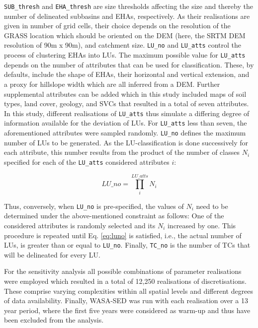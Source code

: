 \verb!SUB_thresh! and \verb!EHA_thresh! are size thresholds affecting the size and thereby the number of delineated subbasins and EHAs, respectively.
As their realisations are given in number of grid cells, their choice depends on the resolution of the GRASS location which should be oriented on the DEM (here, the SRTM DEM resolution of 90\unit{m} x 90\unit{m}), and catchment size.
\verb!LU_no! and \verb!LU_atts! control the process of clustering EHAs into LUs.
The maximum possible value for \verb!LU_atts! depends on the number of attributes that can be used for classification.
These, by defaults, include the shape of EHAs, their horizontal and vertical extension, and a proxy for hillslope width which are all inferred from a DEM.
Further supplemental attributes can be added which in this study included maps of soil types, land cover, geology, and SVCs that resulted in a total of seven attributes.
In this study, different realisations of \verb!LU_atts! thus simulate a differing degree of information available for the deviation of LUs.
For \verb!LU_atts! less than seven, the aforementioned attributes were sampled randomly.
\verb!LU_no! defines the maximum number of LUs to be generated.
As the LU-classification is done successively for each attribute, this number results from the product of the number of classes $N_i$ specified for each of the \verb!LU_atts! considered attributes $i$: 

\begin{equation}
\label{eq:luno}
LU\_no = \prod_i^{LU\_atts} N_i
\end{equation}

Thus, conversely, when \verb!LU_no! is pre-specified, the values of $N_i$ need to be determined under the above-mentioned constraint as follows:
One of the considered attributes is randomly selected and its $N_i$ increased by one.
This procedure is repeated until Eq. \ref{eq:luno} is satisfied, i.e., the actual number of LUs, is greater than or equal to \verb!LU_no!.
Finally, \verb!TC_no! is the number of TCs that will be delineated for every LU.

For the sensitivity analysis all possible combinations of parameter realisations were employed which resulted in a total of 12,250 realisations of discretisations.
These comprise varying complexities within all spatial levels and different degrees of data availability.
Finally, WASA-SED was run with each realisation over a 13 year period, where the first five years were considered as warm-up and thus have been excluded from the analysis.

